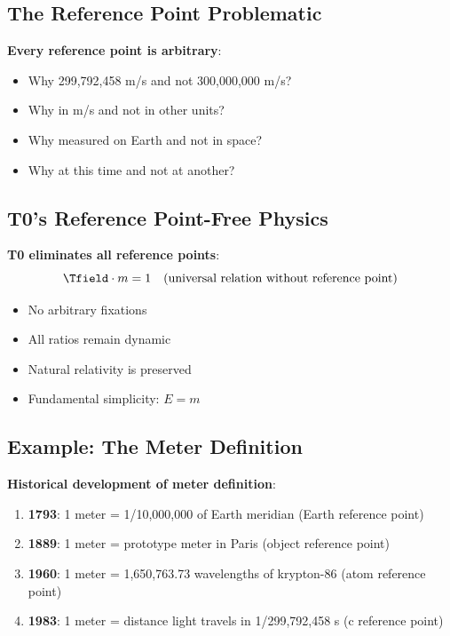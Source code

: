 	\subsection{The Reference Point Problematic}
	
	\textbf{Every reference point is arbitrary}:
	\begin{itemize}
		\item Why 299,792,458 m/s and not 300,000,000 m/s?
		\item Why in m/s and not in other units?
		\item Why measured on Earth and not in space?
		\item Why at this time and not at another?
	\end{itemize}
	
	\subsection{T0's Reference Point-Free Physics}
	
	\textbf{T0 eliminates all reference points}:
	\begin{equation}
		\Tfield \cdot m = 1 \quad \text{(universal relation without reference point)}
	\end{equation}
	
	\begin{itemize}
		\item No arbitrary fixations
		\item All ratios remain dynamic
		\item Natural relativity is preserved
		\item Fundamental simplicity: $E = m$
	\end{itemize}
	
	\subsection{Example: The Meter Definition}
	
	\textbf{Historical development of meter definition}:
	\begin{enumerate}
		\item \textbf{1793}: 1 meter = 1/10,000,000 of Earth meridian (Earth reference point)
		\item \textbf{1889}: 1 meter = prototype meter in Paris (object reference point)  
		\item \textbf{1960}: 1 meter = 1,650,763.73 wavelengths of krypton-86 (atom reference point)
		\item \textbf{1983}: 1 meter = distance light travels in 1/299,792,458 s (c reference point)
	\end{enumerate}
	
